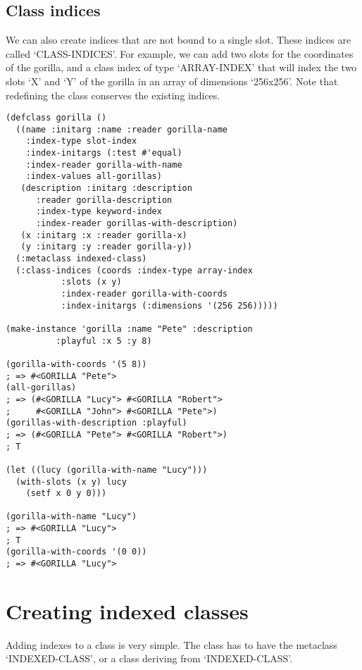 \subsection{ Class indices}

We can also create indices that are not bound to a single
slot. These indices are called `CLASS-INDICES'. For example, we
can add two slots for the coordinates of the gorilla, and a class
index of type `ARRAY-INDEX' that will index the two slots `X' and
`Y' of the gorilla in an array of dimensions `256x256'. Note that
redefining the class conserves the existing indices.

\begin{Verbatim}[fontsize=\small,frame=leftline,framerule=0.9mm,rulecolor=\color{gray},framesep=5.1mm,xleftmargin=5mm,fontfamily=cmtt]
(defclass gorilla ()
  ((name :initarg :name :reader gorilla-name
    :index-type slot-index
    :index-initargs (:test #'equal)
    :index-reader gorilla-with-name
    :index-values all-gorillas)
   (description :initarg :description
      :reader gorilla-description
      :index-type keyword-index
      :index-reader gorillas-with-description)
   (x :initarg :x :reader gorilla-x)
   (y :initarg :y :reader gorilla-y))
  (:metaclass indexed-class)
  (:class-indices (coords :index-type array-index
           :slots (x y)
           :index-reader gorilla-with-coords
           :index-initargs (:dimensions '(256 256)))))

(make-instance 'gorilla :name "Pete" :description
          :playful :x 5 :y 8)

(gorilla-with-coords '(5 8))
; => #<GORILLA "Pete">
(all-gorillas)
; => (#<GORILLA "Lucy"> #<GORILLA "Robert">
;     #<GORILLA "John"> #<GORILLA "Pete">)
(gorillas-with-description :playful)
; => (#<GORILLA "Pete"> #<GORILLA "Robert">)
; T

(let ((lucy (gorilla-with-name "Lucy")))
  (with-slots (x y) lucy
    (setf x 0 y 0)))

(gorilla-with-name "Lucy")
; => #<GORILLA "Lucy">
; T
(gorilla-with-coords '(0 0))
; => #<GORILLA "Lucy">
\end{Verbatim}


\section{ Creating indexed classes}

Adding indexes to a class is very simple. The class has to have
the metaclass `INDEXED-CLASS', or a class deriving from
`INDEXED-CLASS'.



